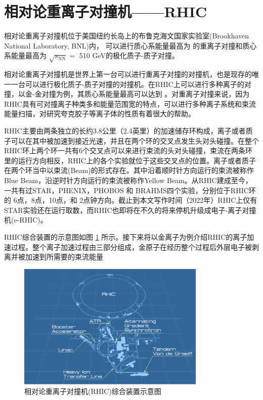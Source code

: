 \section{相对论重离子对撞机——RHIC}

相对论重离子对撞机位于美国纽约长岛上的布鲁克海文国家实验室(Brookhaven National Laboratory, BNL)内，
可以进行质心系能量最高为 \sNNerbai 的重离子对撞和质心系能量最高为 $\sqrt{s_{\mathrm{NN}}} = $ 510 GeV的极化质子-质子对撞。

相对论重离子对撞机是世界上第一台可以进行重离子对撞的对撞机，也是现存的唯一一台可以进行极化质子-质子对撞的对撞机。在RHIC上可以进行多种离子的对撞，以金-金对撞为例，其质心系能量最高可以达到 \sNNerbai 。对重离子对撞来说，因为RHIC具有可对撞离子种类多和能量范围宽的特点，可以进行多种离子系统和束流能量扫描，对研究夸克胶子等离子体的性质有着很大的帮助。

RHIC主要由两条独立的长约3.8公里（2.4英里）的加速储存环构成，离子或者质子可以在其中被加速到接近光速，并且在两个环的交叉点发生头对头碰撞。在整个RHIC环上两个环一共有6个交叉点可以来进行束流的头对头碰撞，束流在两条环里的运行方向相反，RHIC上的各个实验就位于这些交叉点的位置。离子或者质子在两个环当中以束流(Beam)的形式存在。其中沿着顺时针方向运行的束流被称作Blue Beam，沿逆时针方向运行的束流被称作Yellow Beam。从RHIC建成至今，一共有过STAR，PHENIX，PHOBOS 和 BRAHMS四个实验，分别位于RHIC环的 6点，8点，10点，和 2点钟方向。截止到本文写作时间（2022年）RHIC上仅有STAR实验还在运行取数，而RHIC也即将在不久的将来停机升级成电子-离子对撞机(e-RHIC)。

RHIC综合装置的示意图如图 \ref{fig:RHIC} 所示。接下来将以金离子为例介绍RHIC的离子加速过程。整个离子加速过程由三部分组成，金原子在经历整个过程后外层电子被剥离并被加速到所需要的束流能量
\begin{figure}[htb]
    \begin{center}
    \includegraphics[width=0.8\textwidth,clip]{figures/Chapter2/RHIC.png}
    \end{center}
    \caption[相对论重离子对撞机(RHIC)综合装置示意图]{相对论重离子对撞机(RHIC)综合装置示意图}
    \label{fig:RHIC}
\end{figure}

